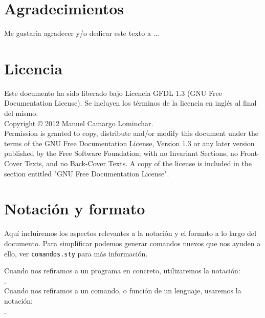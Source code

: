 
\section*{Agradecimientos}

Me gustaria agradecer y/o dedicar este texto a ...

\cleardoublepage

\section*{Licencia}

Este documento ha sido liberado bajo Licencia GFDL 1.3 (GNU Free
Documentation License). Se incluyen los términos de la licencia en
inglés al final del mismo.\\

Copyright © 2012 Manuel Camargo Lominchar.\\

Permission is granted to copy, distribute and/or modify this document under the
terms of the GNU Free Documentation License, Version 1.3 or any later version
published by the Free Software Foundation; with no Invariant Sections, no
Front-Cover Texts, and no Back-Cover Texts. A copy of the license is included in
the section entitled "GNU Free Documentation License".\\

\cleardoublepage

\section*{Notación y formato}

Aquí incluiremos los aspectos relevantes a la notación y el formato a
lo largo del documento. Para simplificar podemos generar comandos
nuevos que nos ayuden a ello, ver \texttt{comandos.sty} para más
información. 

Cuando nos refiramos a un programa en concreto, utilizaremos la
notación: \\ .\\

Cuando nos refiramos a un comando, o función de un lenguaje, usaremos
la notación: \\ .\\